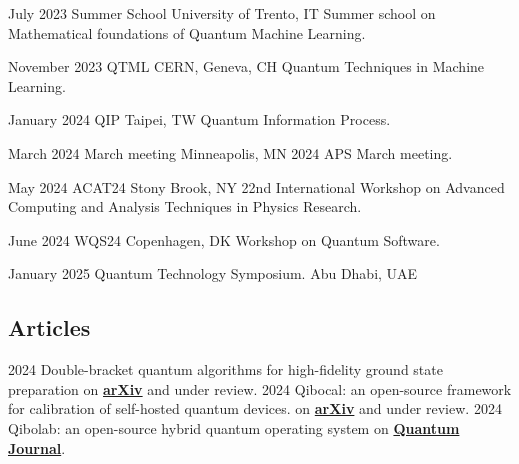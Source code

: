 \documentclass[9pt]{developercv} %
\begin{document}
\begin{entrylist}

    \entry
        {July 2023}
        {Summer School}
        {University of Trento, IT}
        {Summer school on Mathematical foundations of Quantum Machine Learning.}
        {}
         
    \entry
        {November 2023}
        {QTML}
        {CERN, Geneva, CH}
        {Quantum Techniques in Machine Learning.}
        {}

    \entry
        {January 2024}
        {QIP}
        {Taipei, TW}
        {Quantum Information Process.}
        {}

    \entry
        {March 2024}
        {March meeting}
        {Minneapolis, MN}
        {2024 APS March meeting.}
        {}

    \entry
        {May 2024}
        {ACAT24}
        {Stony Brook, NY}
        {22nd International Workshop on Advanced Computing and Analysis Techniques in Physics Research.}
        {}

    \entry
        {June 2024}
        {WQS24}
        {Copenhagen, DK}
        {Workshop on Quantum Software.}
        {}

    \entry
        {January 2025}
        {Quantum Technology Symposium.}
        {Abu Dhabi, UAE}
        {}
        {}
\end{entrylist}




\subsection*{Articles}

\begin{entrylist}
    \entry
        {2024}
        {Double-bracket quantum algorithms for high-fidelity ground state preparation}
        {}
        {on \href{https://doi.org/10.48550/arXiv.2408.03987}{\textbf{arXiv}} and under review.} 
    \entry
        {2024}
        {Qibocal: an open-source framework for calibration of self-hosted quantum devices.}
        {}
        {on \href{https://doi.org/10.48550/arXiv.2410.00101}{\textbf{arXiv}} and under review.} 
        {}
    \entry
        {2024}
        {Qibolab: an open-source hybrid quantum operating system}
        {}
        {on \href{https://quantum-journal.org/papers/q-2024-02-12-1247}{\textbf{Quantum Journal}}.} 
        {}
\end{entrylist}
\end{document}
